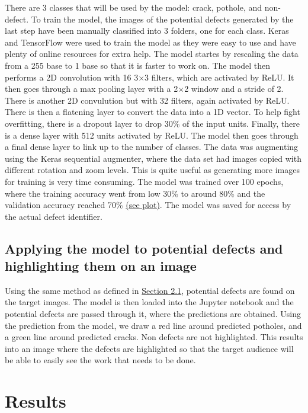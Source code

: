 \documentclass[12pt, letterpaper, twoside]{article}
\begin{document}
There are 3 classes that will be used by the model: crack, pothole, and non-defect. 
To train the model, the images of the potential defects generated by the last step have been manually classified into 3 folders, one for each class.
Keras and TensorFlow were used to train the model as they were easy to use and have plenty of online resources for extra help.
The model startes by rescaling the data from a 255 base to 1 base so that it is faster to work on.
The model then performs a 2D convolution with 16 3$\times$3 filters, which are activated by ReLU\@.
It then goes through a max pooling layer with a 2$\times$2 window and a stride of 2.
There is another 2D convulution but with 32 filters, again activated by ReLU\@.
There is then a flatening layer to convert the data into a 1D vector.
To help fight overfitting, there is a dropout layer to drop 30\% of the input units.
Finally, there is a dense layer with 512 units activated by ReLU\@.
The model then goes through a final dense layer to link up to the number of classes. 
The data was augmenting using the Keras sequential augmenter, where the data set had images copied with different rotation and zoom levels.
This is quite useful as generating more images for training is very time consuming.
The model was trained over 100 epochs, where the training accuracy went from low 30\% to around 80\%
and the validation accuracy reached 70\% \hyperref[app:model_plot]{(see plot)}.
The model was saved for access by the actual defect identifier.

\subsection{Applying the model to potential defects and highlighting them on an image}

Using the same method as defined in \hyperref[sec:meth:1]{Section 2.1}, potential defects are found on the target images.
The model is then loaded into the Jupyter notebook and the potential defects are passed through it, where the predictions are obtained.
Using the prediction from the model, we draw a red line around predicted potholes, and a green line around predicted cracks.
Non defects are not highlighted.
This results into an image where the defects are highlighted so that the target audience will be able to easily see the work that needs to be done.

\section{Results}\label{sec:resu}
\end{document}
